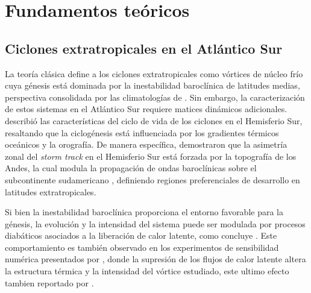\chapter{Fundamentos teóricos}\label{ch:theoretical_background}


\section{Ciclones extratropicales en el Atlántico Sur}\label{sec:tb_fundamentos}

La teoría clásica define a los ciclones extratropicales como vórtices de núcleo frío cuya génesis está dominada por la inestabilidad baroclínica de latitudes medias, perspectiva consolidada por las climatologías de \citet{hoskins2005new}. Sin embargo, la caracterización de estos sistemas en el Atlántico Sur requiere matices dinámicos adicionales.\citet{sinclair1995climatology} describió las características del ciclo de vida de los ciclones en el Hemisferio Sur, resaltando que la ciclogénesis está influenciada por los gradientes térmicos oceánicos y la orografía. 
De manera específica, \citet{inatsu2004zonal} demostraron que la asimetría zonal del \textit{storm track} en el Hemisferio Sur está forzada por la topografía de los Andes, la cual modula la propagación de ondas baroclínicas sobre el subcontinente sudamericano \citep{vera2002cold}, definiendo regiones preferenciales de desarrollo en latitudes extratropicales.

Si bien la inestabilidad baroclínica proporciona el entorno favorable para la génesis, la evolución y la intensidad del sistema puede ser modulada por procesos diabáticos asociados a la liberación de calor latente, como concluye \citet{coutodesouza2024thesis}. 
Este comportamiento es también observado en los experimentos de sensibilidad numérica presentados por \citet{reboita2022from}, donde la supresión de los flujos de calor latente altera la estructura térmica y la intensidad del vórtice estudiado, este ultimo efecto tambien reportado por \citet{gozzo2013air}.

